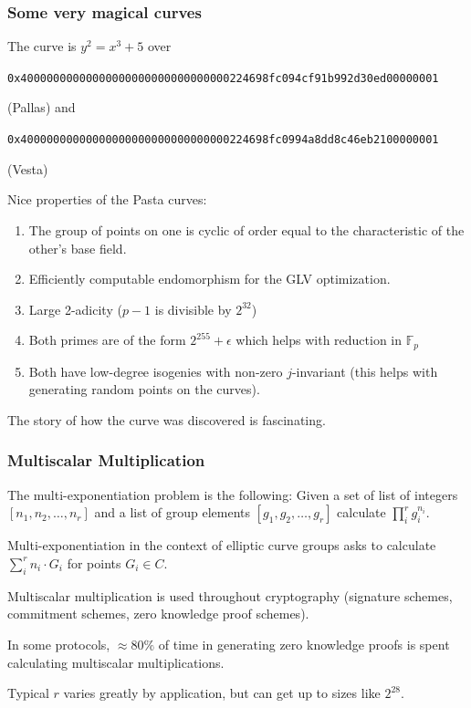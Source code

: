 \documentclass[options]{beamer}
\begin{document}
\begin{frame}[fragile]
    \frametitle{Some very magical curves}
    
    The curve is $y^2 = x^3 + 5$ over 
    \begin{small}\verb+0x40000000000000000000000000000000224698fc094cf91b992d30ed00000001+\end{small}
    (Pallas)
    and
    \begin{small}\verb+0x40000000000000000000000000000000224698fc0994a8dd8c46eb2100000001+\end{small}
    (Vesta) 

    Nice properties of the Pasta curves:
    \begin{enumerate}
        \item The group of points on one is cyclic of order equal to the characteristic of the other's base field.
        \item Efficiently computable endomorphism for the GLV optimization.
        \item Large 2-adicity ($p-1$ is divisible by $2^{32}$)
        \item Both primes are of the form $2^{255} + \epsilon$ which helps with reduction in $\mathbb F_p$
        \item Both have low-degree isogenies with non-zero $j$-invariant (this helps with generating random points on the curves).
    \end{enumerate}

    The story of how the curve was discovered is fascinating.

\end{frame}

\begin{frame}
    \frametitle{Multiscalar Multiplication}

    The multi-exponentiation problem is the following: Given a set of list of integers $[n_1, n_2, \ldots, n_r]$ and a list of group elements $[g_1, g_2, \ldots, g_r]$ calculate $\prod_i^r g_i^{n_i}$.

    Multi-exponentiation in the context of elliptic curve groups asks to calculate $\sum_i^r n_i \cdot G_i$ for points $G_i \in C$. 

    Multiscalar multiplication is used throughout cryptography (signature schemes, commitment schemes, zero knowledge proof schemes). 

    In some protocols, $\approx 80\%$ of time in generating zero knowledge proofs is spent calculating multiscalar multiplications.

    Typical $r$ varies greatly by application, but can get up to sizes like $2^{28}$.
\end{frame}
\end{document}
